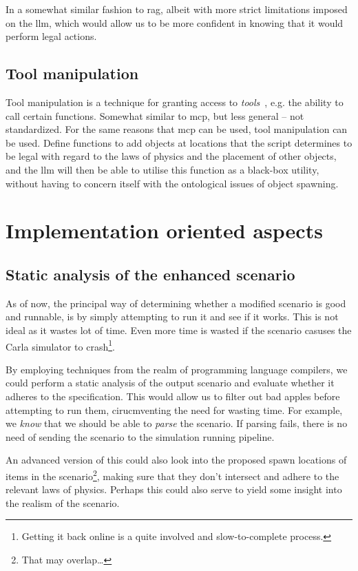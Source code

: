 In a somewhat similar fashion to \acrshort{rag}, albeit with more strict limitations imposed on the
\acrshort{llm}, which would allow us to be more confident in knowing that it would perform legal actions.

\subsection{Tool manipulation}

Tool manipulation is a technique for granting  access to
\emph{tools}~\cite[62]{llmSurvey}, e.g. the ability to call certain functions. Somewhat similar to
\acrshort{mcp}, but less general -- not standardized. For the same reasons that \acrshort{mcp} can
be used, tool manipulation can be used. Define functions to add objects at locations that the script
determines to be legal with regard to the laws of physics and the placement of other objects, and
the \acrshort{llm} will then be able to utilise this function as a black-box utility, without
having to concern itself with the ontological issues of object spawning.

\section{Implementation oriented aspects}


\subsection{Static analysis of the enhanced scenario}

As of now, the principal way of determining whether a modified scenario is good and runnable, is by
simply attempting to run it and see if it works. This is not ideal as it wastes lot of time. Even
more time is wasted if the scenario casuses the Carla simulator to crash\footnote{Getting it back
    online is a quite involved and slow-to-complete process.}.

By employing techniques from the realm of programming language compilers, we could perform a static
analysis of the output scenario and evaluate whether it adheres to the specification. This would
allow us to filter out bad apples before attempting to run them, cirucmventing the need for wasting
time.
For example, we \emph{know} that we should be able to \emph{parse} the scenario. If parsing
fails, there is no need of sending the scenario to the simulation running pipeline.

An advanced version of this could also look into the proposed spawn locations of items in the
scenario\footnote{That may overlap\ldots}, making sure that they don't intersect and adhere to the
relevant laws of physics. Perhaps this could also serve to yield some insight into the realism of
the scenario.

